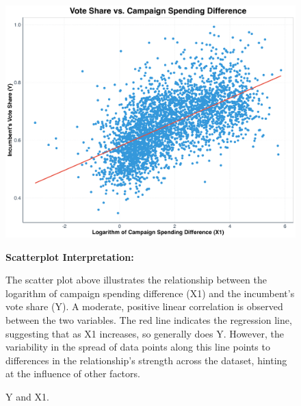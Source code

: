 \documentclass[12pt]{article}
\begin{document}
\begin{figure}[h!]
    \centering
    \includegraphics[width=.75\textwidth]{scatterplot_Y_X1_regression_line.png}
    \caption{\footnotesize Y and X1.}
    \label{fig:plot_1}
    \smallskip
    \raggedright
    \textbf{Scatterplot Interpretation:}
    
    The scatter plot above illustrates the relationship between the logarithm of campaign spending difference (X1) and the incumbent's vote share (Y). A moderate, positive linear correlation is observed between the two variables. The red line indicates the regression line, suggesting that as X1 increases, so generally does Y. However, the variability in the spread of data points along this line points to differences in the relationship's strength across the dataset, hinting at the influence of other factors.
\end{figure}

\newpage
\end{document}
